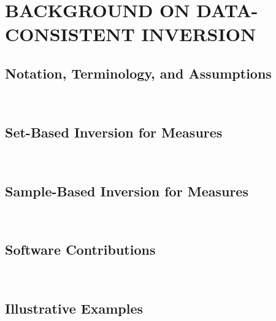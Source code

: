 \chapter{\uppercase{Background on Data-Consistent Inversion} \label{chapter:02}}

\section{Notation, Terminology, and Assumptions}

\
\section{Set-Based Inversion for Measures}

\
\section{Sample-Based Inversion for Measures}

\
\section{Software Contributions}


\
\section{Illustrative Examples}


